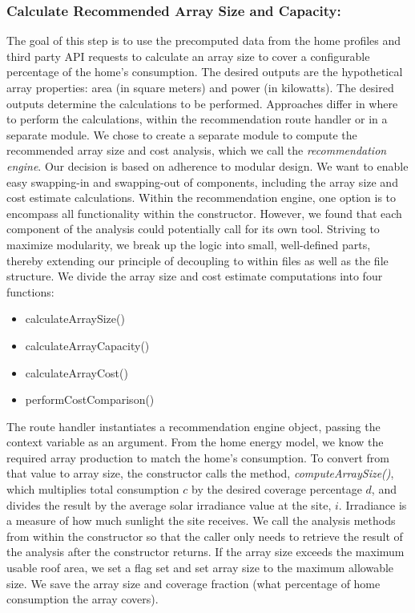 \documentclass[pageno]{jpaper}
\begin{document}
\bigskip

\subsubsection{Calculate Recommended Array Size and Capacity:}
The goal of this step is to use the precomputed data from the home profiles and third party API requests to calculate an array size to cover a configurable percentage of the home's consumption. The desired outputs are the hypothetical array properties: area (in square meters) and power (in kilowatts). The desired outputs determine the calculations to be performed. Approaches differ in where to perform the calculations, within the recommendation route handler or in a separate module. We chose to create a separate module to compute the recommended array size and cost analysis, which we call the {\em recommendation engine}. Our decision is based on adherence to modular design. We want to enable easy swapping-in and swapping-out of components, including the array size and cost estimate calculations. Within the recommendation engine, one option is to encompass all functionality within the constructor. However, we found that each component of the analysis could potentially call for its own tool. Striving to maximize modularity, we break up the logic into small, well-defined parts, thereby extending our principle of decoupling to within files as well as the file structure. We divide the array size and cost estimate computations into four functions:

\begin{itemize}[leftmargin=1in]
\item calculateArraySize()
\item calculateArrayCapacity()
\item calculateArrayCost()
\item performCostComparison()
\end{itemize}

The route handler instantiates a recommendation engine object, passing the context variable as an argument. From the home energy model, we know the required array production to match the home's consumption. To convert from that value to array size, the constructor calls the method, {\em computeArraySize()}, which multiplies total consumption $c$ by the desired coverage percentage $d$, and divides the result by the average solar irradiance value at the site, $i$. Irradiance is a measure of how much sunlight the site receives. We call the analysis methods from within the constructor so that the caller only needs to retrieve the result of the analysis after the constructor returns. If the array size exceeds the maximum usable roof area, we set a flag set and set array size to the maximum allowable size. We save the array size and coverage fraction (what percentage of home consumption the array covers).
\end{document}
